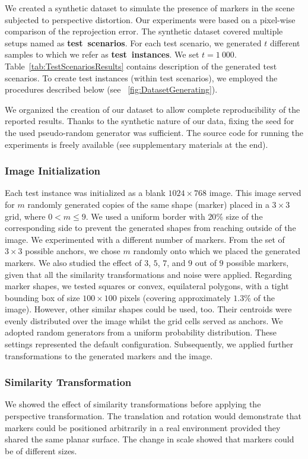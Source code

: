 We created a synthetic dataset to simulate the presence of markers in the scene subjected to perspective distortion. Our experiments were based on a pixel-wise comparison of the reprojection error. The synthetic dataset covered multiple setups named as \mbox{\textbf{test scenarios}}. For each test scenario, we generated $t$ different samples to which we refer as \mbox{\textbf{test instances}}. We set $t = 1\ 000$. Table~\ref{tab:TestScenariosResults} contains description of the generated test scenarios. To create test instances (within test scenarios), we employed the procedures described below (see \figstr{}~\ref{fig:DatasetGenerating}).

We organized the creation of our dataset to allow complete reproducibility of the reported results. Thanks to the synthetic nature of our data, fixing the seed for the used pseudo-random generator was sufficient. The source code for running the experiments is freely available (see supplementary materials at the end).

\subsubsection{Image Initialization}
Each test instance was initialized as a blank $1024 \times 768$ image. This image served for $m$ randomly generated copies of the same shape (marker) placed in a $3 \times 3$ grid, where $0 < m \leq 9$. We used a uniform border with $20$\% size of the corresponding side to prevent the generated shapes from reaching outside of the image. We experimented with a different number of markers. From the set of $3 \times 3$ possible anchors, we chose $m$ randomly onto which we placed the generated markers. We also studied the effect of $3$, $5$, $7$, and $9$ out of $9$ possible markers, given that all the similarity transformations and noise were applied. Regarding marker shapes, we tested squares or convex, equilateral polygons, with a tight bounding box of size $100 \times 100$ pixels (covering approximately $1.3$\% of the image). However, other similar shapes could be used, too. Their centroids were evenly distributed over the image whilst the grid cells served as anchors. We adopted random generators from a uniform probability distribution. These settings represented the default configuration. Subsequently, we applied further transformations to the generated markers and the image.

\subsubsection{Similarity Transformation}
We showed the effect of similarity transformations before applying the perspective transformation. The translation and rotation would demonstrate that markers could be positioned arbitrarily in a real environment provided they shared the same planar surface. The change in scale showed that markers could be of different sizes.

